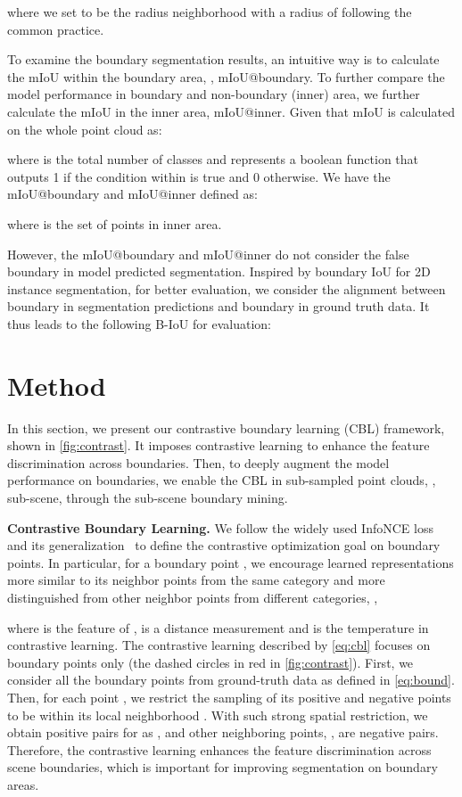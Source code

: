 \documentclass[10pt,twocolumn,letterpaper]{article}
\newcommand{\tly}{}
\begin{document}
where we set  to be the radius neighborhood with a radius of  following the common practice\cite{kpconv, closerlook}.

To examine the boundary segmentation results, an intuitive way is to calculate the mIoU within the boundary area, \ie, mIoU@boundary. To further compare the model performance in boundary and non-boundary (inner) area, we further calculate the mIoU in the inner area, \ie mIoU@inner.
Given that mIoU is calculated on the whole point cloud  as:

where  is the total number of classes and  represents a boolean function that outputs 1 if the condition within  is true and 0 otherwise.
We have the mIoU@boundary and mIoU@inner defined as:

where  is the set of points in inner area.

However, the mIoU@boundary and mIoU@inner do not consider the false boundary in model predicted segmentation. Inspired by boundary IoU\cite{bound_iou} for 2D instance segmentation, for better evaluation, we consider the alignment between boundary in segmentation predictions and boundary in ground truth data. It thus leads to the following B-IoU for evaluation:


\section{Method}
In this section, we present our contrastive boundary learning (CBL) framework{\tly, shown in \cref{fig:contrast}}.
It imposes contrastive learning to enhance the feature discrimination across boundaries. Then, to deeply augment the model performance on boundaries, we enable the CBL in sub-sampled point clouds, \ie, sub-scene, through the sub-scene boundary mining.


\noindent\textbf{Contrastive Boundary Learning.}
We follow the widely used InfoNCE loss\cite{infonce} and its generalization~\cite{nce, softnn} to define the contrastive optimization goal on boundary points.
In particular, for a boundary point , we encourage learned representations more similar to its neighbor points from the same category and more distinguished from other neighbor points from different categories, \ie,
\newcommand{\A}{\mathcal A}
\newcommand{\f}{f}  \newcommand{\B}{\mathcal B}

where  is the feature of ,  is a distance measurement and  is the temperature in contrastive learning.
The contrastive learning described by \cref{eq:cbl} focuses on boundary points only {\tly(the dashed circles in red in \cref{fig:contrast})}. First, we consider all the boundary points  from ground-truth data as defined in \cref{eq:bound}.
Then, for each point , we restrict the sampling of its positive and negative points to be within its local neighborhood . With such strong spatial restriction, we obtain positive pairs for  as , and other neighboring points, \ie , are negative pairs.
Therefore, the contrastive learning enhances the feature discrimination across scene boundaries, which is important for improving segmentation on boundary areas.
\end{document}
